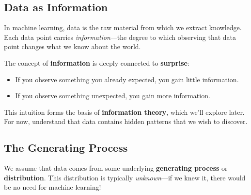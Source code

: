 \subsection{Data as Information}

In machine learning, data is the raw material from which we extract knowledge. Each data point carries \textit{information}---the degree to which observing that data point changes what we know about the world.

\begin{bluebox}
The concept of \textbf{information} is deeply connected to \textbf{surprise}:
\begin{itemize}
    \item If you observe something you already expected, you gain little information.
    \item If you observe something unexpected, you gain more information.
\end{itemize}

This intuition forms the basis of \textbf{information theory}, which we'll explore later. For now, understand that data contains hidden patterns that we wish to discover.
\end{bluebox}

\subsection{The Generating Process}

We assume that data comes from some underlying \textbf{generating process} or \textbf{distribution}. This distribution is typically \textit{unknown}---if we knew it, there would be no need for machine learning!

\begin{center}
\end{center}

